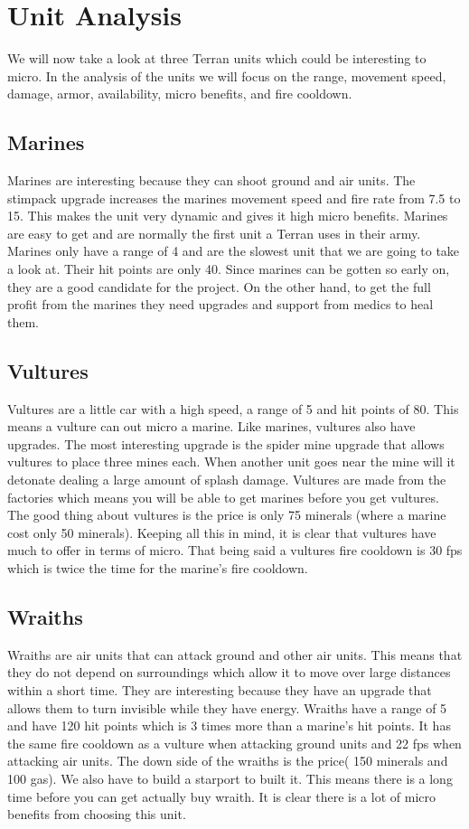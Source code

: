 \section{Unit Analysis}
We will now take a look at three Terran units which could be interesting to micro. In the analysis of the units we will
focus on the range, movement speed, damage, armor, availability, micro benefits, and fire cooldown. 

\subsection{Marines}
Marines are interesting because they can shoot ground and air units. The stimpack upgrade increases the marines movement speed and fire rate from 7.5 to 15. This makes the unit very dynamic and gives it high micro benefits. Marines are easy to get and are normally the first unit a Terran uses in
their army. Marines only have a range of 4 and are the slowest unit that we are going to take a look at. Their
hit points are only 40. Since marines can be gotten so early on, they are a good candidate for the project. On the other hand, to get the full profit from the
marines they need upgrades and support from medics to heal them. 

\subsection{Vultures}
Vultures are a little car with a high speed, a range of 5 and hit points of 80. This means a vulture can out micro a marine. Like marines, vultures also have upgrades. The most interesting upgrade is the spider mine upgrade that allows vultures to place three mines each. When another unit goes near the mine will it detonate dealing a large amount of splash damage. Vultures are made
from the factories which means you will be able to get marines before you get vultures. The good thing about vultures is the price is only 75 minerals (where
a marine cost only 50 minerals). Keeping all this in mind, it is clear that vultures have much to offer in terms of micro.
That being said a vultures fire cooldown is 30 fps which is twice the time for the marine's fire cooldown.\cite{wiki_vulture}

\subsection{Wraiths}
Wraiths are air units that can attack ground and other air units. This means that they do not depend on surroundings which allow it
to move over large distances within a short time. They are interesting because they have an upgrade that allows them to turn invisible while they have energy. Wraiths have a range of 5 and have 120 hit points which is 3 times more than a marine's hit points. It has the same fire cooldown
as a vulture when attacking ground units and 22 fps when attacking air units.  
The down side of the wraiths is the price( 150 minerals and 100 gas). We also have to build a starport to built it. This means
there is a long time before you can get actually buy wraith. It is clear there is a lot of micro benefits from choosing this unit. 

